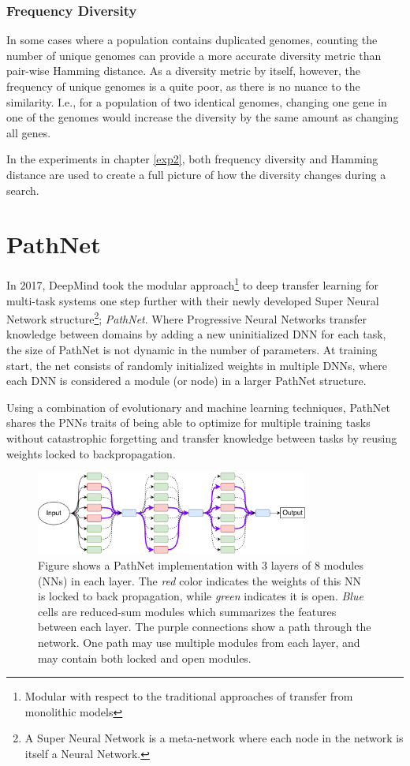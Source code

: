 \subsubsection{Frequency Diversity}
In some cases where a population contains duplicated genomes, counting the number of unique genomes can provide a more accurate diversity metric than pair-wise Hamming distance. As a diversity metric by itself, however, the frequency of unique genomes is a quite poor, as there is no nuance to the similarity. I.e., for a population of two identical genomes, changing one gene in one of the genomes would increase the diversity by the same amount as changing all genes. 

In the experiments in chapter \ref{exp2}, both frequency diversity and Hamming distance are used to create a full picture of how the diversity changes during a search.

\section{PathNet}
\label{background:pn}
In 2017, DeepMind took the modular approach\footnote{Modular with respect to the traditional approaches of transfer from monolithic models} to deep transfer learning for multi-task systems one step further with their newly developed Super Neural Network structure\footnote{A Super Neural Network is a meta-network where each node in the network is itself a Neural Network.}; \textit{PathNet}\cite{pathnet}. Where Progressive Neural Networks transfer knowledge between domains by adding a new uninitialized DNN for each task, the size of PathNet is not dynamic in the number of parameters. At training start, the net consists of randomly initialized weights in multiple DNNs, where each DNN is considered a module (or node) in a larger PathNet structure. 

Using a combination of evolutionary and machine learning techniques, PathNet shares the PNNs traits of being able to optimize for multiple training tasks without catastrophic forgetting and transfer knowledge between tasks by reusing weights locked to backpropagation.  
\begin{figure}[ht]
    \centering
    \includegraphics[width=0.8\textwidth]{Chapters/2.Background/figures/PathNet.pdf}
    \caption[PathNet structure]{Figure shows a PathNet implementation with 3 layers of 8 modules (NNs) in each layer. The \textit{red} color indicates the weights of this NN is locked to back propagation, while \textit{green} indicates it is open. \textit{Blue} cells are reduced-sum modules which summarizes the features between each layer. The purple connections show a path through the network. One path may use multiple modules from each layer, and may contain both locked and open modules.}
    \label{fig:pathnet}
\end{figure}

